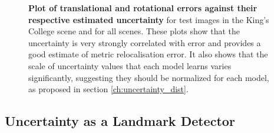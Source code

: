 \begin{figure}[p]
\begin{center}
\end{center}
   \caption[Plot of translational and rotational errors against uncertainty]{\textbf{Plot of translational and rotational errors against their respective estimated uncertainty} for test images in the King's College scene and for all scenes. These plots show that the uncertainty is very strongly correlated with error and provides a good estimate of metric relocalisation error. It also shows that the scale of uncertainty values that each model learns varies significantly, suggesting they should be normalized for each model, as proposed in section \ref{ch:uncertainty_dist}.}
\label{fig:error_vs_uncertainty}
\clearpage
\end{figure}

\subsection{Uncertainty as a Landmark Detector}

